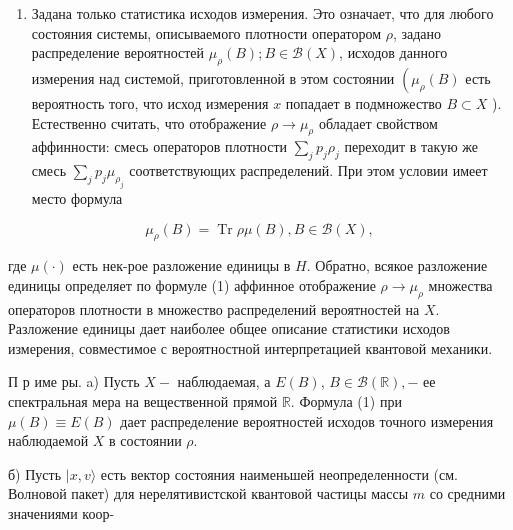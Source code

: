 \documentclass[10pt]{article}
\begin{document}
\begin{enumerate}

  \item Задана только статистика исходов измерения. Это означает, что для любого состояния системы, описываемого плотности оператором $\rho$, задано распределение вероятностей $\mu_{\rho}(B) ; B \in \mathscr{B}(X)$, исходов данного измерения над системой, приготовленной в этом состоянии $\left(\mu_{\rho}(B)\right.$ есть вероятность того, что исход измерения $x$ попадает в подмножество $B \subset X$ ). Естественно считать, что отображение $\rho \rightarrow \mu_{\rho}$ обладает свойством аффинности: смесь операторов плотности $\sum_{j} p_{j} \rho_{j}$ переходит в такую же смесь $\sum_{j} p_{j} \mu_{\rho_{j}}$ соответствующих распределений. При этом условии имеет место формула

\end{enumerate}



\[

\mu_{\rho}(B)=\operatorname{Tr} \rho \mathscr{\mu}(B), B \in \mathscr{B}(X),

\]



где $\mathscr{\mu}(\cdot)$ есть нек-рое разложение единицы в $H$. Обратно, всякое разложение единицы определяет по формуле (1) аффинное отображение $\rho \rightarrow \mu_{\rho}$ множества операторов плотности в множество распределений вероятностей на $X$. Разложение единицы дает наиболее общее описание статистики исходов измерения, совместимое с вероятностной интерпретацией квантовой механики.



П р име ры. a) Пусть $X-$ наблюдаемая, а $E(B)$, $B \in \mathscr{B}(\mathbb{R}),-$ ее спектральная мера на вещественной прямой $\mathbb{R}$. Формула (1) при $\mu(B) \equiv E(B)$ дает распределение вероятностей исходов точного измерения наблюдаемой $X$ в состоянии $\rho$.



б) Пусть $|x, v\rangle$ есть вектор состояния наименьшей неопределенности (см. Волновой пакет) для нерелятивистской квантовой частицы массы $m$ со средними значениями коор-
\end{document}
